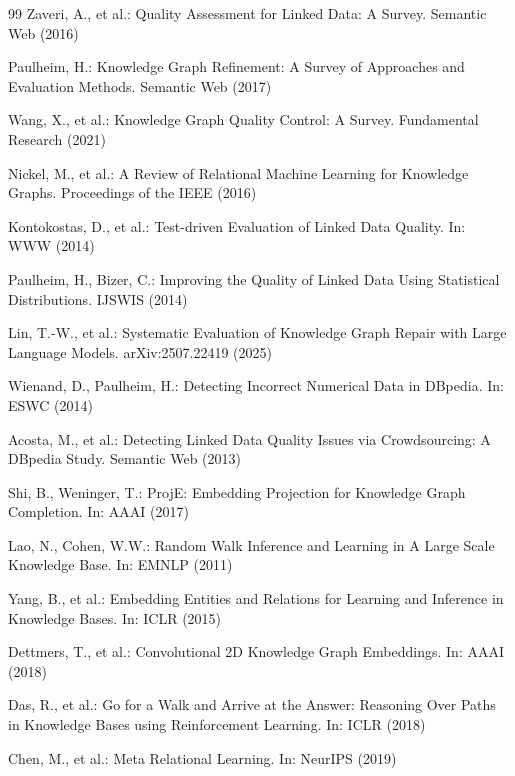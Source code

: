\documentclass[runningheads]{llncs}
\begin{document}
\begin{thebibliography}{99}
Zaveri, A., et al.: Quality Assessment for Linked Data: A Survey. Semantic Web (2016)

Paulheim, H.: Knowledge Graph Refinement: A Survey of Approaches and Evaluation Methods. Semantic Web (2017)

Wang, X., et al.: Knowledge Graph Quality Control: A Survey. Fundamental Research (2021)

Nickel, M., et al.: A Review of Relational Machine Learning for Knowledge Graphs. Proceedings of the IEEE (2016)

Kontokostas, D., et al.: Test-driven Evaluation of Linked Data Quality. In: WWW (2014)

Paulheim, H., Bizer, C.: Improving the Quality of Linked Data Using Statistical Distributions. IJSWIS (2014)

Lin, T.-W., et al.: Systematic Evaluation of Knowledge Graph Repair with Large Language Models. arXiv:2507.22419 (2025)

Wienand, D., Paulheim, H.: Detecting Incorrect Numerical Data in DBpedia. In: ESWC (2014)

Acosta, M., et al.: Detecting Linked Data Quality Issues via Crowdsourcing: A DBpedia Study. Semantic Web (2013)

Shi, B., Weninger, T.: ProjE: Embedding Projection for Knowledge Graph Completion. In: AAAI (2017)

Lao, N., Cohen, W.W.: Random Walk Inference and Learning in A Large Scale Knowledge Base. In: EMNLP (2011)

Yang, B., et al.: Embedding Entities and Relations for Learning and Inference in Knowledge Bases. In: ICLR (2015)

Dettmers, T., et al.: Convolutional 2D Knowledge Graph Embeddings. In: AAAI (2018)

Das, R., et al.: Go for a Walk and Arrive at the Answer: Reasoning Over Paths in Knowledge Bases using Reinforcement Learning. In: ICLR (2018)

Chen, M., et al.: Meta Relational Learning. In: NeurIPS (2019)
\end{thebibliography}
\end{document}
